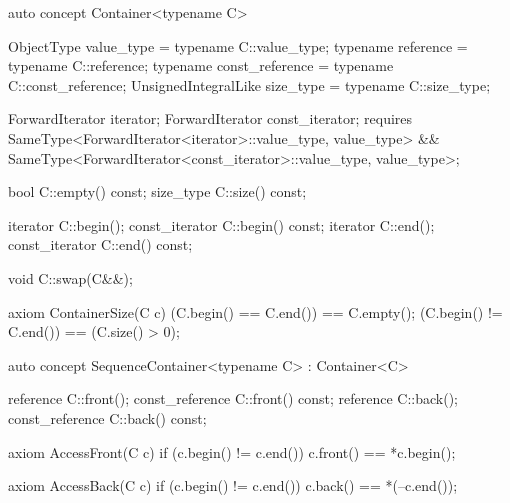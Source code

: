\documentclass[american,twoside]{book}
\begin{document}
\begin{itemdecl}
auto concept Container<typename C> {
  ObjectType           value_type      = typename C::value_type;
  typename             reference       = typename C::reference;
  typename             const_reference = typename C::const_reference;
  UnsignedIntegralLike size_type       = typename C::size_type;

  ForwardIterator iterator;
  ForwardIterator const_iterator;
  requires SameType<ForwardIterator<iterator>::value_type, value_type> 
           && SameType<ForwardIterator<const_iterator>::value_type, value_type>;

  bool      C::empty() const;
  size_type C::size() const;

  iterator       C::begin();
  const_iterator C::begin() const;
  iterator       C::end();
  const_iterator C::end() const;

  void C::swap(C&&);

  axiom ContainerSize(C c) {
    (C.begin() == C.end()) == C.empty();
    (C.begin() != C.end()) == (C.size() > 0);
  }
}
\end{itemdecl}

\begin{itemdescr}
\pnum
{}

\pnum
\addedConcepts{\mbox{\requires} for a (possibly
  \mbox{\tcode{const}}-qualified) container \mbox{\tcode{C}},
  \mbox{\tcode{[C.begin(), C.end())}} is a valid range.}
\end{itemdescr}

\begin{itemdecl}
auto concept SequenceContainer<typename C> : Container<C> {
  reference       C::front();
  const_reference C::front() const;
  reference       C::back();
  const_reference C::back() const;

  axiom AccessFront(C c) {
    if (c.begin() != c.end()) c.front() == *c.begin();
  }  

  axiom AccessBack(C c) {
    if (c.begin() != c.end()) c.back() == *(--c.end());
  }
}
\end{itemdecl}

\begin{itemdescr}
\pnum
{} 
\end{itemdescr}
\end{document}
